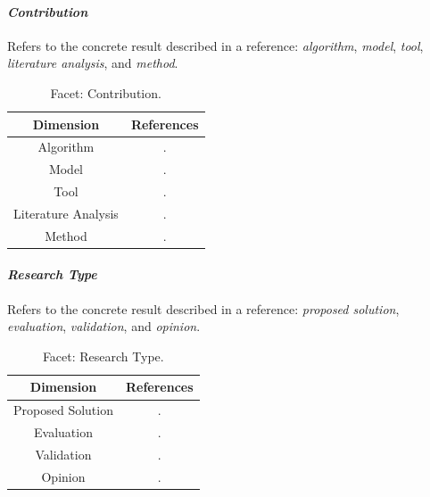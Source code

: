 \paragraph{\bf\em Contribution} 
Refers to the concrete result described in a reference: {\em algorithm},	{\em
model}, 	{\em tool}, {\em literature analysis}, and {\em	method}.
\begin{table}\centering
\footnotesize
\begin{tabular}{|c|c|}\hline
\textbf{Dimension} & \textbf{References} \\ \hline
Algorithm	& 
\parbox{0.6\textwidth}{\cite{}.}
\\ \hline
Model	& 
\parbox{0.6\textwidth}{\cite{}.}
\\ \hline
Tool		&
\parbox{0.6\textwidth}{\cite{}.}
\\ \hline
Literature Analysis		&
\parbox{0.6\textwidth}{\cite{}.}
\\ \hline
Method	&	
\parbox{0.6\textwidth}{\cite{}.}
\\ \hline

\end{tabular}
\caption{\label{table:biblioContrib} Facet: Contribution.}
\end{table}

\paragraph{\bf\em Research Type} 
Refers to the concrete result described in a reference: {\em proposed solution},
{\em evaluation}, 	{\em validation}, and {\em opinion}.
\begin{table}\centering
\footnotesize
\begin{tabular}{|c|c|}\hline
\textbf{Dimension} & \textbf{References} \\ \hline
Proposed Solution	& 
\parbox{0.6\textwidth}{\cite{}.}
\\ \hline
Evaluation	& 
\parbox{0.6\textwidth}{\cite{}.}
\\ \hline
Validation		&
\parbox{0.6\textwidth}{\cite{}.}
\\ \hline
Opinion		&
\parbox{0.6\textwidth}{\cite{}.}
\\ \hline
\end{tabular}
\caption{\label{table:biblioResearch} Facet: Research Type.}
\end{table}


